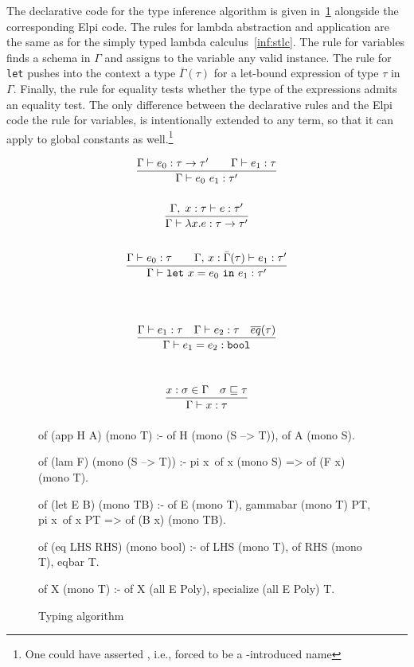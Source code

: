 \documentclass{these-ISSS}
\newenvironment{elpicode}
  {\VerbatimEnvironment\begin{elpibox}\begin{xelpicode}}{\end{xelpicode}
\end{elpibox}}
\begin{document}
The declarative code for the type inference algorithm is given
in~\cref{fig:hm} alongside the corresponding Elpi code.
 The
rules for lambda abstraction and application are the same as for the simply
typed lambda calculus~\cref{inf:stlc}. The rule for variables finds a schema
in $\Gamma$ and assigns to the variable any valid instance. The rule for
\texttt{let} pushes into the context a type $\overline{\Gamma}(\tau)$ for a
let-bound expression of type $\tau$ in $\Gamma$. Finally, the rule for
equality tests whether the type of the expressions admits an equality test.
The only difference between the declarative rules and the Elpi code
the rule for variables,
is intentionally extended to any term, so that it can apply to global
constants as well.\footnote{One could have asserted , i.e.,
forced  to be a -introduced name}

\begin{figure}[!h]
\begin{minipage}{0.5\textwidth}
$$
\begin{array}{c}
\displaystyle\frac{\Gamma \vdash e_0:\tau \rightarrow \tau' \quad\quad \Gamma \vdash e_1 : \tau }{\Gamma \vdash e_0\ e_1 : \tau'}
\vspace{1.8em}
\\
\displaystyle\frac{\Gamma,\;x:\tau\vdash e:\tau'}{\Gamma \vdash \lambda x.e : \tau \rightarrow \tau'}
\vspace{2.2em}
\\
\displaystyle\frac{\Gamma \vdash e_0:\tau \quad\quad \Gamma,\,x:\bar{\Gamma}(\tau) \vdash e_1:\tau'}{\Gamma \vdash \mathtt{let}\ x = e_0\ \mathtt{in}\ e_1 :  \tau'}
\vspace{4.2em}
\\
\displaystyle\frac{\Gamma \vdash e_1 : \tau \quad \Gamma \vdash e_2 : \tau \quad \overline{eq}(\tau)}{\Gamma \vdash e_1 = e_2: \mathtt{bool}}
\vspace{3.2em}
\\
\displaystyle\frac{x:\sigma \in \Gamma \quad \sigma \sqsubseteq \tau}{\Gamma \vdash x:\tau}
\vspace{0.6em}
\end{array}
$$
\end{minipage}
\begin{minipage}{0.55\textwidth}

\begin{elpicode}
of (app H A) (mono T) :-
  of H (mono (S --> T)),
  of A (mono S).

of (lam F) (mono (S --> T)) :-
  pi x\ of x (mono S) =>
    of (F x) (mono T).

of (let E B) (mono TB) :-
  of E (mono T),
  gammabar (mono T) PT,
  pi x\ of x PT =>
    of (B x) (mono TB).

of (eq LHS RHS) (mono bool) :-
  of LHS (mono T),
  of RHS (mono T),
  eqbar T.

of X (mono T) :-
  of X (all E Poly),
  specialize (all E Poly) T.
\end{elpicode}
\end{minipage}
\caption{Typing algorithm\label{fig:hm}}
\end{figure}
\end{document}
